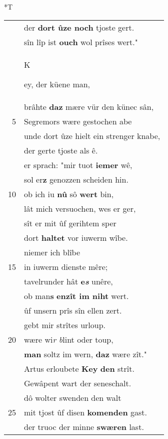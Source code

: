 \documentclass[8pt,a4paper,notitlepage]{article}
\begin{document}
\begin{table}[ht]
\begin{minipage}[t]{0.5\linewidth}
\end{minipage}
\hspace{0.5cm}
\begin{minipage}[t]{0.5\linewidth}
\small
\begin{center}*T
\end{center}
\begin{tabular}{rl}
 & der \textbf{dort ûze noch} tjoste gert.\\ 
 & sîn lîp ist \textbf{ouch} wol prîses wert."\\ 
 & \begin{large}K\end{large}ey, der küene man,\\ 
 & brâhte \textbf{daz} mære vür den künec sân,\\ 
5 & Segremors wære gestochen abe\\ 
 & unde dort ûze hielt ein strenger knabe,\\ 
 & der gerte tjoste als ê.\\ 
 & er sprach: "mir tuot \textbf{iemer} wê,\\ 
 & sol er\textbf{z} genozzen scheiden hin.\\ 
10 & ob ich iu \textbf{nû} sô \textbf{wert} bin,\\ 
 & lât mich versuochen, wes er ger,\\ 
 & sît er mit ûf gerihtem sper\\ 
 & dort \textbf{haltet} vor iuwerm wîbe.\\ 
 & niemer ich blîbe\\ 
15 & in iuwerm dienste mêre;\\ 
 & tavelrunder hât \textbf{e\textit{s}} unêre,\\ 
 & ob man\textbf{s} \textbf{enzît im niht} wert.\\ 
 & ûf unsern prîs sîn ellen zert.\\ 
 & gebt mir strîtes urloup.\\ 
20 & wære wi\textit{r b}lint oder toup,\\ 
 & \textbf{man} soltz im wern, \textbf{daz} wære zît."\\ 
 & Artus erloubete \textbf{Key} \textbf{den} strît.\\ 
 & Gewâpent wart der seneschalt.\\ 
 & dô wolter swenden den walt\\ 
25 & mit tjost ûf disen \textbf{komenden} gast.\\ 
 & der truoc der minne \textbf{swæren} last.\\ 

\end{tabular}
\end{minipage}
\end{table}
\end{document}

